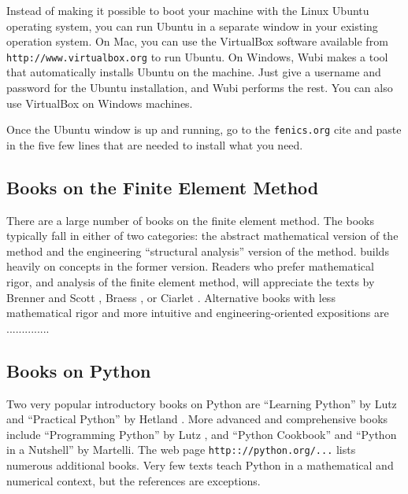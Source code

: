 Instead of making it possible to boot your machine with the Linux
Ubuntu operating system, you can run Ubuntu in a separate window in
your existing operation system. On Mac, you can use the VirtualBox
software available
from {\fontsize{12pt}{12pt}\texttt{http://www.virtualbox.org}} to run Ubuntu.  On Windows, Wubi
makes a tool that automatically installs Ubuntu on the machine. Just
give a username and password for the Ubuntu installation, and Wubi
performs the rest. You can also use VirtualBox on Windows machines.

Once the Ubuntu window
is up and running, go to the {\fontsize{12pt}{12pt}\texttt{fenics.org}} cite and paste in
the five few lines that are needed to install what you need.


\subsection{Books on the Finite Element Method}
\label{langtangen:appendix:books}
There are a large number of books on the finite element method.
The books typically fall in either of two categories: the abstract
mathematical version of the method and the engineering ``structural analysis''
version of the method. \fenics{} builds heavily on concepts in the former
version. Readers who prefer mathematical rigor, and analysis of the
finite element method, will appreciate the texts by
Brenner and Scott \cite{BrennerScott2008}, Braess \cite{Braess2007}, or
Ciarlet \cite{Ciarlet2002a}.
Alternative books with
less mathematical rigor and more intuitive and engineering-oriented
expositions are ..............


\subsection{Books on Python}
\label{langtangen:appendix:pybooks}

Two very popular introductory books on Python are
``Learning Python''  by Lutz \cite{Lutz2007} and
``Practical Python''  by Hetland \cite{Hetland2002}.
More advanced and comprehensive books include
``Programming Python'' by Lutz \cite{Lutz2006},
and ``Python Cookbook'' \cite{MartelliAscher2005} and ``Python in a Nutshell''
\cite{Martelli2006} by Martelli.
The web page {\fontsize{12pt}{12pt}\texttt{http:://python.org/...}} lists numerous additional
books.
Very few texts teach Python in a mathematical and numerical context,
but the references \cite{Langtangen2009,Langtangen2009b} are exceptions.



